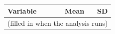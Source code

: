\begin{tabular}{lrr}
\toprule
\textbf{Variable} & \textbf{Mean} & \textbf{SD} \\
\midrule
\multicolumn{3}{c}{(filled in when the analysis runs)} \\
\bottomrule
\end{tabular}
